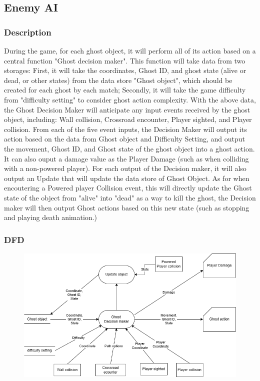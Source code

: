 \documentclass[11pt]{article}
\begin{document}
\subsection{Enemy AI}
\subsubsection{Description}
During the game, for each ghost object, it will perform all of its action based on a central function "Ghost decision maker". This function will take data from two storages: First, it will take the coordinates, Ghost ID, and ghost state (alive or dead, or other states) from the data store "Ghost object", which should be created for each ghost by each match; Secondly, it will take the game difficulty from "difficulty setting" to consider ghost action complexity. With the above data, the Ghost Decision Maker will anticipate any input events received by the ghost object, including: Wall collision, Crossroad encounter, Player sighted, and Player collision. From each of the five event inputs, the Decision Maker will output its action based on the data from Ghost object and Difficulty Setting, and output the movement, Ghost ID, and Ghost state of the ghost object into a ghost action. It can also ouput a damage value as the Player Damage (such as when colliding with a non-powered player). For each output of the Decision maker, it will also output an Update that will update the data store of Ghost Object. As for when encoutering a Powered player Collision event, this will directly update the Ghost state of the object from "alive" into "dead" as a way to kill the ghost, the Decision maker will then output Ghost actions based on this new state (such as stopping and playing death animation.)
\subsubsection{DFD}
\begin{figure}[H]
    \centering
    \includegraphics*[scale=0.4]{GhostAI_DFD.png}
\end{figure}
\end{document}
